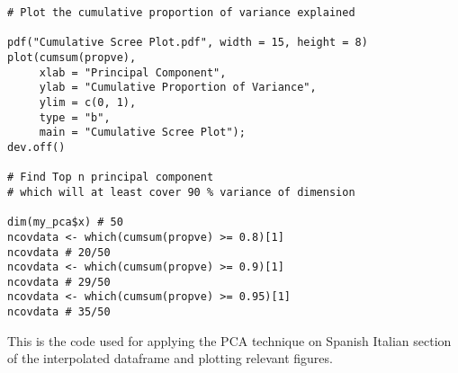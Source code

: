\begin{verbatim}
# Plot the cumulative proportion of variance explained

pdf("Cumulative Scree Plot.pdf", width = 15, height = 8) 
plot(cumsum(propve),
     xlab = "Principal Component",
     ylab = "Cumulative Proportion of Variance",
     ylim = c(0, 1), 
     type = "b",
     main = "Cumulative Scree Plot");
dev.off()

# Find Top n principal component
# which will at least cover 90 % variance of dimension

dim(my_pca$x) # 50
ncovdata <- which(cumsum(propve) >= 0.8)[1] 
ncovdata # 20/50
ncovdata <- which(cumsum(propve) >= 0.9)[1] 
ncovdata # 29/50
ncovdata <- which(cumsum(propve) >= 0.95)[1] 
ncovdata # 35/50
\end{verbatim}

This is the code used for applying the PCA technique on Spanish Italian section of the interpolated dataframe and plotting relevant figures.
